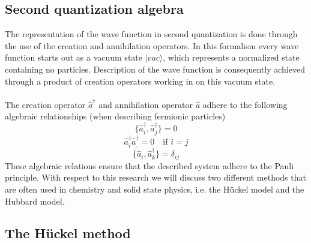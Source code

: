 \documentclass[12pt]{article}
\begin{document}
\subsection{Second quantization algebra}
The representation of the wave function in second quantization is done through the use of the creation and annihilation operators. In this formalism every wave function starts out as a vacuum state $\lvert vac \rangle$, which represents a normalized state containing no particles. Description of the wave function is consequently achieved through a product of creation operators working in on this vacuum state.
\\
\\
The creation operator $\hat{a}^\dagger$ and  annihilation operator $\hat{a}$ adhere to the following algebraic relationships (when describing fermionic particles)\cite{Surj1989}
\begin{equation}
	\{\hat{a}^\dagger_i, \hat{a}^\dagger_j\} = 0
\end{equation}
\begin{equation}
	\hat{a}^\dagger_i\hat{a}^\dagger_, = 0 \quad \text{if } i=j
\end{equation}
\begin{equation}
	\{\hat{a}_{i}, \hat{a}^{\dagger}_{k} \} = \delta_{ij}
\end{equation}
These algebraic relations ensure that the described system adhere to the Pauli principle. With respect to this research we will discuss two different methods that are often used in chemistry and solid state physics, i.e. the Hückel model and the Hubbard model.

\subsection{The Hückel method}
\end{document}
